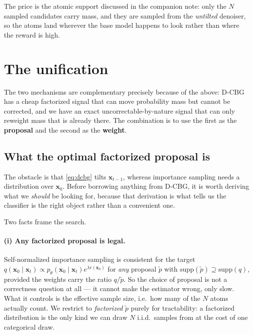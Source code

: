 \documentclass[11pt]{article}
\newcommand{\x}{\mathbf{x}}
\begin{document}
The price is the atomic support discussed in the companion note: only the $N$
sampled candidates carry mass, and they are sampled from the \emph{untilted}
denoiser, so the atoms land wherever the base model happens to look rather than
where the reward is high.

\section{The unification}

The two mechanisms are complementary precisely because of the above:
D-CBG has a cheap factorized signal that can move probability mass but cannot
be corrected, and we have an exact uncorrectable-by-nature signal that can only
reweight mass that is already there. The combination is to use the first as the
\textbf{proposal} and the second as the \textbf{weight}.

\subsection{What the optimal factorized proposal is}
\label{sec:optimal}

The obstacle is that \eqref{eq:dcbg} tilts $\x_{t-1}$, whereas importance
sampling needs a distribution over $\x_0$. Before borrowing anything from
D-CBG, it is worth deriving what we \emph{should} be looking for, because that
derivation is what tells us the classifier is the right object rather than a
convenient one.

Two facts frame the search.

\paragraph{(i) Any factorized proposal is legal.} Self-normalized importance
sampling is consistent for the target
$q(\x_0 \mid \x_t) \propto p_\theta(\x_0 \mid \x_t) e^{\lambda r(\x_0)}$ for
\emph{any} proposal $\tilde{p}$ with
$\mathrm{supp}(\tilde{p}) \supseteq \mathrm{supp}(q)$, provided the weights
carry the ratio $q/\tilde{p}$. So the choice of proposal is not a correctness
question at all --- it cannot make the estimator wrong, only slow. What it
controls is the effective sample size, i.e.\ how many of the $N$ atoms actually
count. We restrict to \emph{factorized} $\tilde{p}$ purely for tractability: a
factorized distribution is the only kind we can draw $N$ i.i.d.\ samples from at
the cost of one categorical draw.
\end{document}
